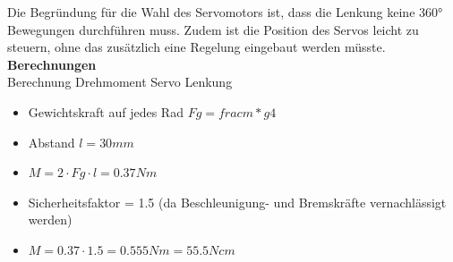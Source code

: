 Die Begründung für die Wahl des Servomotors ist, dass die Lenkung keine 360° Bewegungen durchführen muss. Zudem ist die Position des Servos leicht zu steuern, ohne das zusätzlich eine Regelung eingebaut werden müsste. \\[0.2cm]
\textbf{Berechnungen}\\[0.2cm]
Berechnung Drehmoment Servo Lenkung
\begin{itemize}
\item Gewichtskraft auf jedes Rad $Fg = frac{m*g}{4}$
\item Abstand $l = 30mm$
\item $M = 2\cdot Fg\cdot l = 0.37Nm$
\item Sicherheitsfaktor = 1.5 (da Beschleunigung- und Bremskräfte vernachlässigt werden)
\item $M = 0.37\cdot 1.5 = 0.555Nm = 55.5Ncm$
\end{itemize}